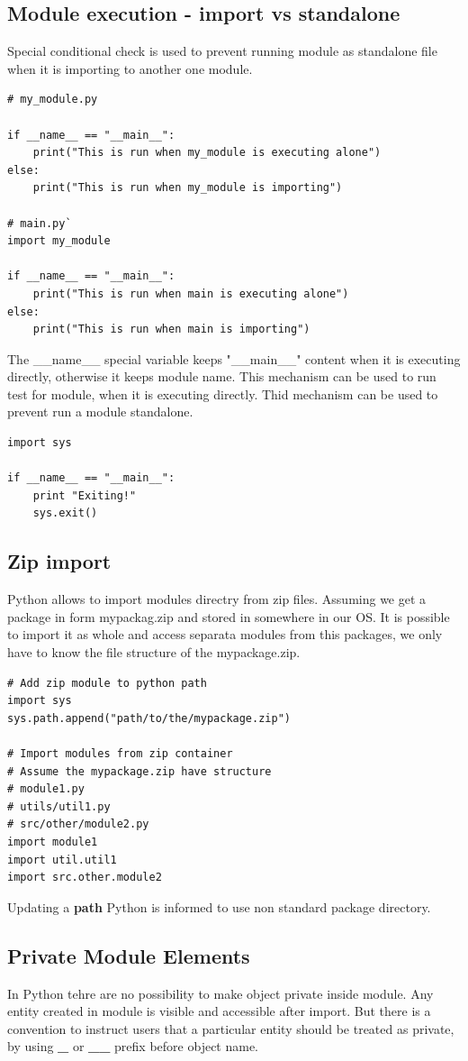 \documentclass{article}
\begin{document}
\subsection{Module execution - import vs standalone}
Special conditional check is used to prevent running module as standalone file when it is importing to another one module.
\begin{lstlisting}[style=pystyle]
# my_module.py

if __name__ == "__main__":
	print("This is run when my_module is executing alone")
else:
	print("This is run when my_module is importing")
	
# main.py`
import my_module

if __name__ == "__main__":
	print("This is run when main is executing alone")
else:
	print("This is run when main is importing")
\end{lstlisting}
The \_\_name\_\_ special variable keeps "\_\_main\_\_" content when it is executing directly, otherwise it keeps module name. This mechanism can be used to run test for module, when it is executing directly.
Thid mechanism can be used to prevent run a module standalone.
\begin{lstlisting}[style=pystyle]
import sys

if __name__ == "__main__":
    print "Exiting!"
    sys.exit()
\end{lstlisting}

\subsection{Zip import}
Python allows to import modules directry from zip files. Assuming we get a package in form mypackag.zip and stored in somewhere in our OS. It is possible to import it as whole and access separata modules from this packages, we only have to know the file structure of the mypackage.zip. 
\begin{lstlisting}[style=pystyle]
# Add zip module to python path
import sys
sys.path.append("path/to/the/mypackage.zip")

# Import modules from zip container
# Assume the mypackage.zip have structure
# module1.py
# utils/util1.py
# src/other/module2.py
import module1
import util.util1
import src.other.module2
\end{lstlisting}
Updating a \textbf{path} Python is informed to use non standard package directory.

\subsection{Private Module Elements}
In Python tehre are no possibility to make object private inside module. Any entity created in module is visible and accessible after import. But there is a convention  to instruct users that a particular entity should be treated as private, by using \textbf{\_} or \textbf{\_\_} prefix before object name.
\end{document}
